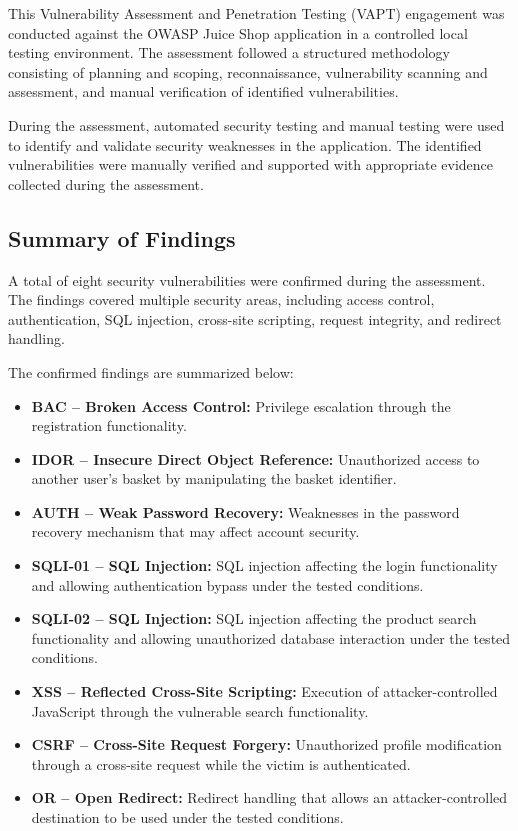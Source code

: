 This Vulnerability Assessment and Penetration Testing (VAPT)
engagement was conducted against the OWASP Juice Shop application in
a controlled local testing environment. The assessment followed a
structured methodology consisting of planning and scoping,
reconnaissance, vulnerability scanning and assessment, and manual
verification of identified vulnerabilities.

During the assessment, automated security testing and manual testing
were used to identify and validate security weaknesses in the
application. The identified vulnerabilities were manually verified
and supported with appropriate evidence collected during the
assessment.

\subsection*{Summary of Findings}

A total of eight security vulnerabilities were confirmed during the
assessment. The findings covered multiple security areas, including
access control, authentication, SQL injection, cross-site scripting,
request integrity, and redirect handling.

The confirmed findings are summarized below:

\begin{itemize}
    \item \textbf{BAC -- Broken Access Control:} Privilege escalation
    through the registration functionality.

    \item \textbf{IDOR -- Insecure Direct Object Reference:}
    Unauthorized access to another user's basket by manipulating the
    basket identifier.

    \item \textbf{AUTH -- Weak Password Recovery:} Weaknesses in the
    password recovery mechanism that may affect account security.

    \item \textbf{SQLI-01 -- SQL Injection:} SQL injection affecting
    the login functionality and allowing authentication bypass under
    the tested conditions.

    \item \textbf{SQLI-02 -- SQL Injection:} SQL injection affecting
    the product search functionality and allowing unauthorized
    database interaction under the tested conditions.

    \item \textbf{XSS -- Reflected Cross-Site Scripting:} Execution
    of attacker-controlled JavaScript through the vulnerable search
    functionality.

    \item \textbf{CSRF -- Cross-Site Request Forgery:} Unauthorized
    profile modification through a cross-site request while the
    victim is authenticated.

    \item \textbf{OR -- Open Redirect:} Redirect handling that allows
    an attacker-controlled destination to be used under the tested
    conditions.
\end{itemize}

